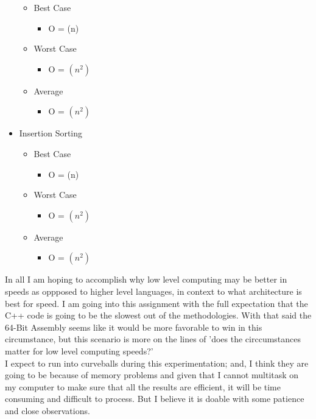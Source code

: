 \documentclass{article}
\begin{document}
\begin{itemize}
\begin{itemize}
			\item Best Case
				\begin{itemize}
				\item O = (n)
				\end{itemize}
			\item Worst Case
				\begin{itemize}
				\item O = $(n^2)$ 
				\end{itemize}
			\item Average
				\begin{itemize}
				 \item O = $(n^2)$ 
				\end{itemize}
		\end{itemize}

	\item Insertion Sorting \cite{functions}
			\begin{itemize}
			
			\item Best Case
				\begin{itemize}
				\item O = (n)
				\end{itemize}
			\item Worst Case
				\begin{itemize}
				\item O = $(n^2)$ 
				\end{itemize}
			\item Average
				\begin{itemize}
				 \item O = $(n^2)$ 
				\end{itemize}
		\end{itemize}
	\end{itemize}

\clearpage

\indent In all I am hoping to accomplish why low level computing may be better in speeds as oppposed to higher level languages, in context to what architecture is best for speed. I am going into this assignment with the full expectation that the C++ code is going to be the slowest out of the methodologies. With that said the 64-Bit Assembly seems like it would be more favorable to win in this circumstance, but this scenario is more on the lines of 'does the circcumstances matter for low level computing speeds?'
\\
\indent I expect to run into curveballs during this experimentation; and, I think they are going to be because of memory problems and given that I cannot multitask on my computer to make sure that all the results are efficient, it will be time consuming and difficult to process. But I believe it is doable with some patience and close observations.
\end{document}
